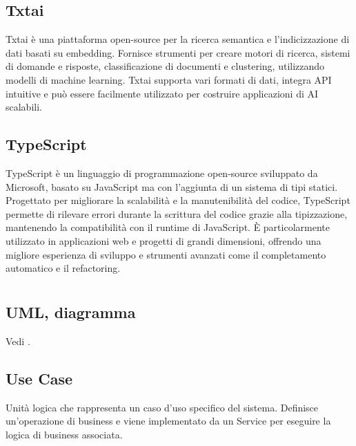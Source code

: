 \hypertarget{sec:txtai}{}
\subsection*{Txtai}
Txtai è una piattaforma open-source per la ricerca semantica e l'indicizzazione di dati basati su embedding. Fornisce strumenti per creare motori di 
ricerca, sistemi di domande e risposte, classificazione di documenti e clustering, utilizzando modelli di machine learning. Txtai supporta vari formati 
di dati, integra API intuitive e può essere facilmente utilizzato per costruire applicazioni di AI scalabili.

\hypertarget{sec:typescript}{}
\subsection*{TypeScript}
TypeScript è un linguaggio di programmazione open-source sviluppato da Microsoft, basato su JavaScript ma con l'aggiunta di un sistema di tipi statici. 
Progettato per migliorare la scalabilità e la manutenibilità del codice, TypeScript permette di rilevare errori durante la scrittura del codice grazie 
alla tipizzazione, mantenendo la compatibilità con il runtime di JavaScript. È particolarmente utilizzato in applicazioni web e progetti di grandi 
dimensioni, offrendo una migliore esperienza di sviluppo e strumenti avanzati come il completamento automatico e il refactoring.

\newpage



\section{}

\hypertarget{sec:uml}{}
\subsection*{UML, diagramma}
Vedi .

\hypertarget{sec:use case}{}
\subsection*{Use Case}
Unità logica che rappresenta un caso d’uso specifico del sistema. Definisce un’operazione di business e viene implementato da un Service per eseguire la logica di business associata.

\newpage



